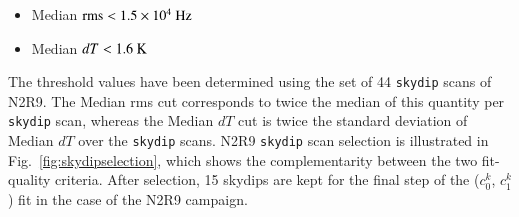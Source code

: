 \documentclass[traditionalabstract]{aa}
\newcommand{\lp}[1]{#1}
\begin{document}
\begin{itemize}
\item Median $\rm{rms} < 1.5 \times 10^{4}~\rm{Hz}$
\item Median $dT < 1.6~\rm{K}$
\end{itemize}

The threshold values have been determined using the set of 44 {\tt skydip}
scans of N2R9. The Median rms cut corresponds to twice the median of
this quantity per {\tt skydip} scan, whereas the Median $dT$ cut is twice
the standard deviation of Median $dT$ over the {\tt skydip} scans.
N2R9 {\tt skydip} scan selection is illustrated in
{\lp Fig.~\ref{fig:skydipselection},
which shows the complementarity between the two fit-quality
criteria. After selection, 15 skydips are kept for the final step of
the ($c_0^k$, $c_1^k$) fit in the case of the N2R9 campaign.}
\end{document}
